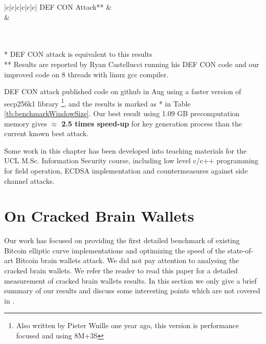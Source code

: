 \begin{table}[h!]
\begin{tabular}{|c|c|c|c|c|c|}
		DEF CON Attack**      &                                   \\ \hline
		&                                   \\ \hline
	\end{tabular}
	\\ \mbox{} \\ * DEF CON attack \cite{RyanDefcon} is equivalent to this results 
	\\ ** Results are reported by Ryan Castellucci running his DEF CON code and our improved code on 8 threads with linux gcc compiler.
\end{table}

DEF CON attack \cite{RyanDefcon} published code on github in Aug using a faster version of secp256k1 library \footnote{Also written by Pieter Wuille one year ago, this version is performance focused and using 8M+3S}, and the results is marked as * in Table \ref{tb:benchmarkWindowSize}.  Our best result using 1.09 GB precomputation memory gives  \textbf{$\approx$ 2.5 times speed-up} for key generation process than the current known best attack.

Some work in this chapter has been developed into teaching materials for the UCL M.Sc. Information Security course, including low level c/c++ programming for field operation, ECDSA implementation and countermeasures against side channel attacks. 
\section{On Cracked Brain Wallets}
Our work has focused on providing the first detailed benchmark of existing Bitcoin elliptic curve implementations and optimizing the speed of the state-of-art Bitcoin brain wallets attack. We did not pay attention to analysing the cracked brain wallets. We refer the reader to read this paper \cite{vasek2016bitcoin} for a detailed measurement of cracked brain wallets results. In this section we only give a brief summary of our results and discuss some interesting points which are not covered in \cite{vasek2016bitcoin}.


